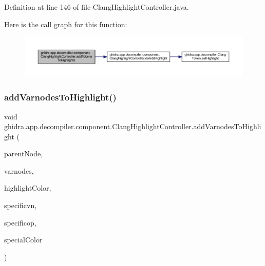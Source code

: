Definition at line 146 of file Clang\+Highlight\+Controller.\+java.

Here is the call graph for this function\+:
\nopagebreak
\begin{figure}[H]
\begin{center}
\leavevmode
\includegraphics[width=350pt]{classghidra_1_1app_1_1decompiler_1_1component_1_1_clang_highlight_controller_a918b0d193cddef3e884da17c1813bb46_cgraph}
\end{center}
\end{figure}
\mbox{\label{classghidra_1_1app_1_1decompiler_1_1component_1_1_clang_highlight_controller_a415977d3fa133edd37c344be0371cfcb}} 
\subsubsection{\texorpdfstring{addVarnodesToHighlight()}{addVarnodesToHighlight()}}
{\footnotesize\ttfamily void ghidra.\+app.\+decompiler.\+component.\+Clang\+Highlight\+Controller.\+add\+Varnodes\+To\+Highlight (\begin{DoxyParamCaption}\item[{\mbox{\hyperlink{interfaceghidra_1_1app_1_1decompiler_1_1_clang_node}{Clang\+Node}}}]{parent\+Node,  }\item[{Set$<$ \mbox{\hyperlink{class_varnode}{Varnode}} $>$}]{varnodes,  }\item[{Color}]{highlight\+Color,  }\item[{\mbox{\hyperlink{class_varnode}{Varnode}}}]{specificvn,  }\item[{\mbox{\hyperlink{class_pcode_op}{Pcode\+Op}}}]{specificop,  }\item[{Color}]{special\+Color }\end{DoxyParamCaption})\hspace{0.3cm}{\ttfamily [inline]}}



